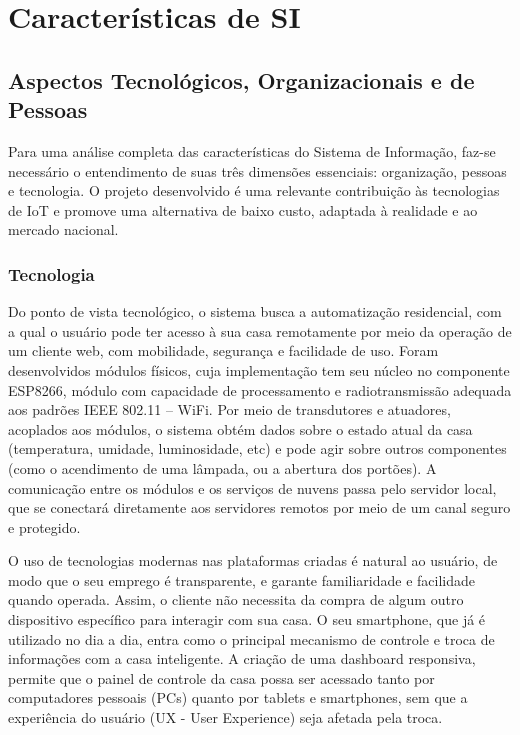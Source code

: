 \chapter{Características de SI}

\section{Aspectos Tecnológicos, Organizacionais e de Pessoas}

Para uma análise completa das características do Sistema de Informação, faz-se necessário o entendimento de suas três dimensões essenciais: organização, pessoas e tecnologia. O projeto desenvolvido é uma relevante contribuição às tecnologias de IoT e promove uma alternativa de baixo custo, adaptada à realidade e ao mercado nacional.

\subsection{Tecnologia}

Do ponto de vista tecnológico, o sistema busca a automatização residencial, com a qual o usuário pode ter acesso à sua casa remotamente por meio da operação de um cliente web, com mobilidade, segurança e facilidade de uso. Foram desenvolvidos módulos físicos, cuja implementação tem seu núcleo no componente ESP8266, módulo com capacidade de processamento e radiotransmissão adequada aos padrões IEEE 802.11 -- WiFi. Por meio de transdutores e atuadores, acoplados aos módulos, o sistema obtém dados sobre o estado atual da casa (temperatura, umidade, luminosidade, etc) e pode agir sobre outros componentes (como o acendimento de uma lâmpada, ou a abertura dos portões). A comunicação entre os módulos e os serviços de nuvens passa pelo servidor local, que se conectará diretamente aos servidores remotos por meio de um canal seguro e protegido.

O uso de tecnologias modernas nas plataformas criadas é natural ao usuário, de modo que o seu emprego é transparente, e garante familiaridade e facilidade quando operada. Assim, o cliente não necessita da compra de algum outro dispositivo específico para interagir com sua casa. O seu smartphone, que já é utilizado no dia a dia, entra como o principal mecanismo de controle e troca de informações com a casa inteligente. A criação de uma dashboard responsiva, permite que o painel de controle da casa possa ser acessado tanto por computadores pessoais (PCs) quanto por tablets e smartphones, sem que a experiência do usuário (UX - User Experience) seja afetada pela troca.


